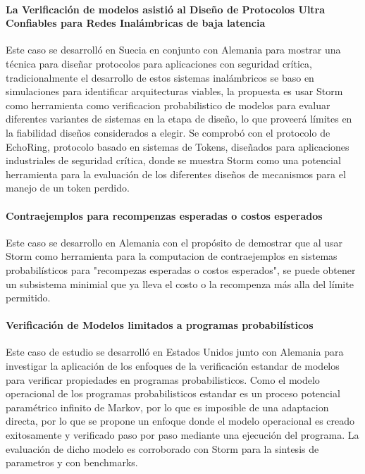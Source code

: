 \documentclass[11pt]{article}
\begin{document}
\paragraph{La Verificaci\'on de modelos asisti\'o al Dise\~no de Protocolos Ultra Confiables para Redes Inal\'ambricas de baja latencia }
Este caso se desarroll\'o en Suecia en conjunto con Alemania para mostrar una t\'ecnica para dise\~nar protocolos para aplicaciones con seguridad cr\'itica, tradicionalmente el desarrollo de estos sistemas inal\'ambricos se baso en simulaciones para identificar arquitecturas viables, la propuesta es usar Storm como herramienta como verificacion probabilistico de modelos para evaluar diferentes variantes de sistemas en la etapa de dise\~no, lo que proveer\'a límites en la fiabilidad diseños considerados a elegir. Se comprob\'o con el protocolo de EchoRing, protocolo basado en sistemas de Tokens, dise\~nados para aplicaciones industriales de seguridad cr\'itica, donde se muestra Storm como una potencial herramienta para la evaluaci\'on de los diferentes dise\~nos de mecanismos para el manejo de un token perdido.

\paragraph{Contraejemplos para recompenzas esperadas o costos esperados}
Este caso se desarrollo en Alemania con el prop\'osito de demostrar que al usar Storm como herramienta para la computacion de contraejemplos en sistemas probabil\'isticos para "recompezas esperadas o costos esperados", se puede obtener un subsistema minimial que ya lleva el costo o la recompenza m\'as alla del l\'imite permitido.

\paragraph{Verificaci\'on de Modelos limitados a programas probabil\'isticos}
Este caso de estudio se desarroll\'o en Estados Unidos junto con Alemania para investigar la aplicaci\'on de los enfoques de la verificaci\'on estandar de modelos para verificar propiedades en programas probabilisticos. Como el modelo operacional de los programas probabilisticos estandar es un proceso potencial param\'etrico infinito de Markov, por lo que es imposible de una adaptacion directa, por lo que se propone un enfoque donde el modelo operacional es creado exitosamente y verificado paso por paso mediante una ejecuci\'on del programa. La evaluaci\'on de dicho modelo es corroborado con Storm  para la sintesis de parametros  y con benchmarks.
\end{document}
